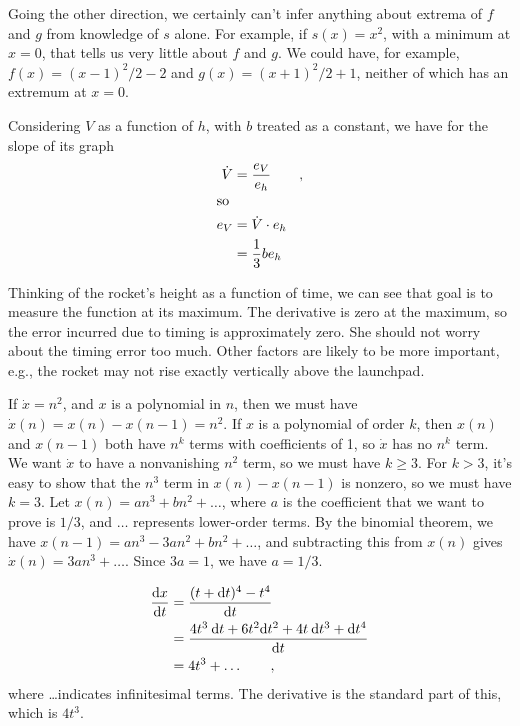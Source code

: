 Going the other direction, we certainly can't infer anything about extrema of $f$ and $g$ from knowledge of $s$ alone.
For example, if $s(x)=x^2$, with a minimum at $x=0$, that tells us very little about $f$ and $g$. We could have, for example,
$f(x)=(x-1)^2/2-2$ and $g(x)=(x+1)^2/2+1$, neither of which has an extremum at $x=0$.


Considering $V$ as a function of $h$, with $b$ treated as a constant, we have for the slope
of its graph
\begin{align*}
  \dot{V} &= \frac{e_V}{e_h} \qquad ,\\
\intertext{so}
  e_V &= \dot{V}\cdot e_h \\
      &= \frac{1}{3}b e_h
\end{align*}


Thinking of the rocket's height as a function of time, we can see that goal is to measure
the function at its maximum. The derivative is zero at the maximum, so the error incurred
due to timing is approximately zero. She should not worry about the timing error too much.
Other factors are likely to be more important, e.g., the rocket may not rise exactly
vertically above the launchpad.

If $\dot{x}=n^2$, and $x$ is a polynomial in $n$, then we must have
$\dot{x}(n)=x(n)-x(n-1)=n^2$. If $x$ is a polynomial of order $k$, then
$x(n)$ and $x(n-1)$ both have $n^k$ terms with coefficients of 1, so 
$\dot{x}$ has no $n^k$ term. We want $\dot{x}$ to have a nonvanishing $n^2$ term,
so we must have $k\ge 3$. For $k>3$, it's easy to show that the $n^3$ term in
$x(n)-x(n-1)$ is nonzero, so we must have $k=3$. Let $x(n)=an^3+bn^2+\ldots$, where
$a$ is the coefficient that we want to prove is $1/3$, and $\ldots$ represents
lower-order terms. By the binomial theorem, we have $x(n-1)=an^3-3an^2+bn^2+\ldots$,
and subtracting this from $x(n)$ gives $\dot{x}(n)=3an^3+\ldots$. Since $3a=1$,
we have $a=1/3$.



\begin{align*}
  \frac{\textup{d} x}{\textup{d} t} &= \frac{(t+\textup{d} t)^4-t^4}{\textup{d} t} \\
                        &= \frac{4t^3\:\textup{d} t + 6t^2\textup{d} t^2 + 4t\:\textup{d} t^3+\textup{d} t^4}{\textup{d} t} \\
                        &= 4t^3 + \ldots \qquad ,
\end{align*}
where \ldots indicates infinitesimal terms.
The derivative is the standard part of this, which is $4t^3$.

